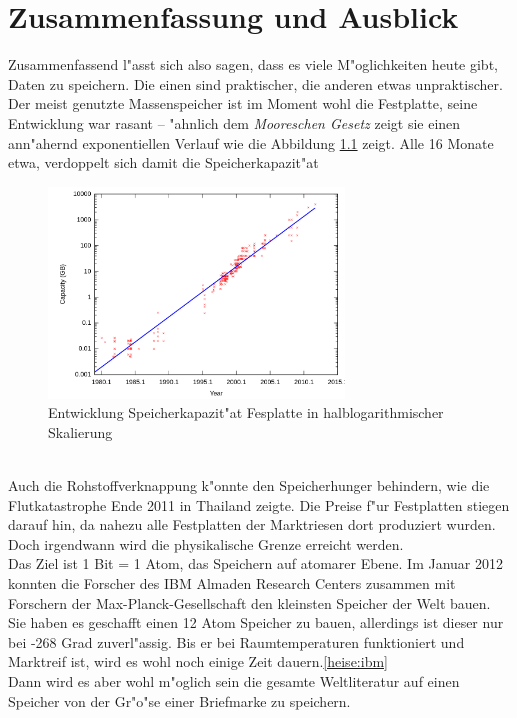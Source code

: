 
\chapter{Zusammenfassung und Ausblick}
\label{ch:Zusammenfassung}
Zusammenfassend l"asst sich also sagen, dass es viele M"oglichkeiten heute gibt, Daten zu speichern. Die einen sind praktischer, die anderen etwas unpraktischer.
Der meist genutzte Massenspeicher ist im Moment wohl die Festplatte, seine Entwicklung war rasant – "ahnlich dem \textit{Mooreschen Gesetz} zeigt sie einen ann"ahernd exponentiellen Verlauf wie die Abbildung \ref{fig:kapazit} zeigt. Alle 16 Monate etwa, verdoppelt sich damit die Speicherkapazit"at
\begin{figure}[ht]
				\centering
				\includegraphics[width=0.7\textwidth]{images/kapazit} 
				\caption[Entwicklung Speicherkapazit"at Fesplatte in halblogarithmischer Skalierung \cite{fig:kapazit}]{Entwicklung Speicherkapazit"at Fesplatte in halblogarithmischer Skalierung}
				\label{fig:kapazit}
				\end{figure}
\\
Auch die Rohstoffverknappung k"onnte den Speicherhunger behindern, wie die Flutkatastrophe Ende 2011 in Thailand zeigte. Die Preise f"ur Festplatten stiegen darauf hin, da nahezu alle Festplatten der Marktriesen dort produziert wurden.
\\
Doch irgendwann wird die physikalische Grenze erreicht werden.
\\
Das Ziel ist 1 Bit = 1 Atom, das Speichern auf atomarer Ebene. Im Januar 2012 konnten die Forscher des IBM Almaden Research Centers zusammen mit Forschern der Max-Planck-Gesellschaft den kleinsten Speicher der Welt bauen. Sie haben es geschafft einen 12 Atom Speicher zu bauen, allerdings ist dieser nur bei -268 Grad zuverl"assig. Bis er bei Raumtemperaturen funktioniert und Marktreif ist, wird es wohl noch einige Zeit dauern.\ref{heise:ibm} 
\\
Dann wird es aber wohl m"oglich sein die gesamte Weltliteratur auf einen Speicher von der Gr"o"se einer Briefmarke zu speichern. 

